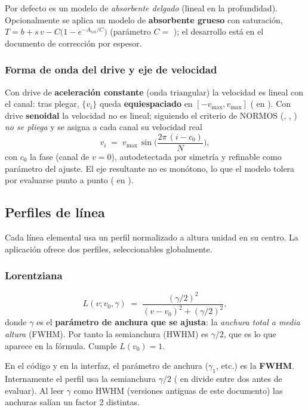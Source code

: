 Por defecto es un modelo de \emph{absorbente delgado} (lineal en la profundidad).
Opcionalmente se aplica un modelo de \textbf{absorbente grueso} con saturación,
$T = b + s\,v - C\bigl(1-e^{-A_{\text{tot}}/C}\bigr)$ (parámetro $C=$
); el desarrollo está en el documento de corrección por espesor.

\subsubsection{Forma de onda del drive y eje de velocidad}\label{sec:drive}
Con drive de \textbf{aceleración constante} (onda triangular) la velocidad es
lineal con el canal: tras plegar, $\{v_i\}$ queda \textbf{equiespaciado} en
$[-v_{\max},v_{\max}]$ ( en ). Con drive
\textbf{senoidal} la velocidad no es lineal; siguiendo el criterio de NORMOS
(, , ) \emph{no se
pliega} y se asigna a cada canal su velocidad real
\begin{equation}
  v_i \;=\; v_{\max}\,\sin\!\Big(\frac{2\pi\,(i-c_0)}{N}\Big),
\end{equation}
con $c_0$ la fase (canal de $v=0$), autodetectada por simetría y refinable como
parámetro del ajuste. El eje resultante no es monótono, lo que el modelo tolera
por evaluarse punto a punto ( en ).

\subsection{Perfiles de línea}\label{sec:lineshape}

Cada línea elemental usa un perfil normalizado a altura unidad en su centro. La
aplicación ofrece dos perfiles, seleccionables globalmente.

\subsubsection{Lorentziana}
\begin{equation}
  L(v;v_0,\gamma) \;=\; \frac{(\gamma/2)^{2}}{(v-v_0)^{2}+(\gamma/2)^{2}},
  \label{eq:lorentz}
\end{equation}
donde $\gamma$ es el \textbf{parámetro de anchura que se ajusta}: la
\emph{anchura total a media altura} (FWHM). Por tanto la semianchura (HWHM) es
$\gamma/2$, que es lo que aparece en la fórmula. Cumple $L(v_0)=1$.

\begin{nota}
En el código y en la interfaz, el parámetro de anchura ($\gamma_1$, etc.) es la
\textbf{FWHM}. Internamente el perfil usa la semianchura $\gamma/2$
( en  divide entre dos antes de evaluar).
Al leer $\gamma$ como HWHM (versiones antiguas de este documento) las anchuras
salían un factor 2 distintas.
\end{nota}

